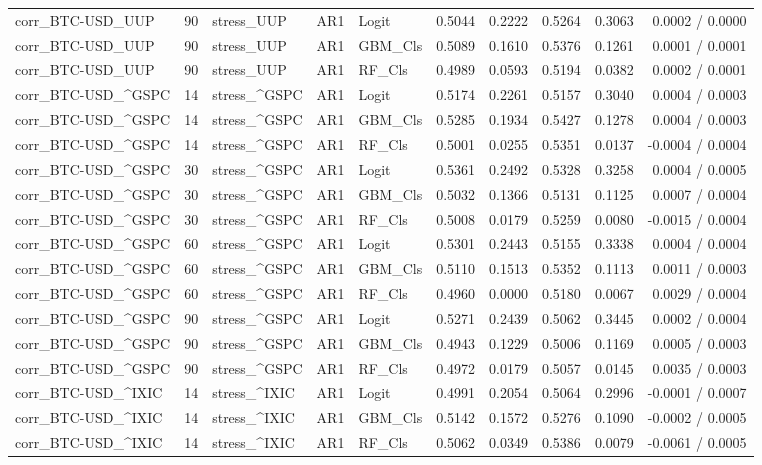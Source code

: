 \begin{table}[H]
\begin{tabular}{lllllrrrrr}
corr_BTC-USD_UUP & 90 & stress_UUP & AR1 & Logit & 0.5044 & 0.2222 & 0.5264 & 0.3063 & 0.0002 / 0.0000 \\
corr_BTC-USD_UUP & 90 & stress_UUP & AR1 & GBM_Cls & 0.5089 & 0.1610 & 0.5376 & 0.1261 & 0.0001 / 0.0001 \\
corr_BTC-USD_UUP & 90 & stress_UUP & AR1 & RF_Cls & 0.4989 & 0.0593 & 0.5194 & 0.0382 & 0.0002 / 0.0001 \\
corr_BTC-USD_^GSPC & 14 & stress_^GSPC & AR1 & Logit & 0.5174 & 0.2261 & 0.5157 & 0.3040 & 0.0004 / 0.0003 \\
corr_BTC-USD_^GSPC & 14 & stress_^GSPC & AR1 & GBM_Cls & 0.5285 & 0.1934 & 0.5427 & 0.1278 & 0.0004 / 0.0003 \\
corr_BTC-USD_^GSPC & 14 & stress_^GSPC & AR1 & RF_Cls & 0.5001 & 0.0255 & 0.5351 & 0.0137 & -0.0004 / 0.0004 \\
corr_BTC-USD_^GSPC & 30 & stress_^GSPC & AR1 & Logit & 0.5361 & 0.2492 & 0.5328 & 0.3258 & 0.0004 / 0.0005 \\
corr_BTC-USD_^GSPC & 30 & stress_^GSPC & AR1 & GBM_Cls & 0.5032 & 0.1366 & 0.5131 & 0.1125 & 0.0007 / 0.0004 \\
corr_BTC-USD_^GSPC & 30 & stress_^GSPC & AR1 & RF_Cls & 0.5008 & 0.0179 & 0.5259 & 0.0080 & -0.0015 / 0.0004 \\
corr_BTC-USD_^GSPC & 60 & stress_^GSPC & AR1 & Logit & 0.5301 & 0.2443 & 0.5155 & 0.3338 & 0.0004 / 0.0004 \\
corr_BTC-USD_^GSPC & 60 & stress_^GSPC & AR1 & GBM_Cls & 0.5110 & 0.1513 & 0.5352 & 0.1113 & 0.0011 / 0.0003 \\
corr_BTC-USD_^GSPC & 60 & stress_^GSPC & AR1 & RF_Cls & 0.4960 & 0.0000 & 0.5180 & 0.0067 & 0.0029 / 0.0004 \\
corr_BTC-USD_^GSPC & 90 & stress_^GSPC & AR1 & Logit & 0.5271 & 0.2439 & 0.5062 & 0.3445 & 0.0002 / 0.0004 \\
corr_BTC-USD_^GSPC & 90 & stress_^GSPC & AR1 & GBM_Cls & 0.4943 & 0.1229 & 0.5006 & 0.1169 & 0.0005 / 0.0003 \\
corr_BTC-USD_^GSPC & 90 & stress_^GSPC & AR1 & RF_Cls & 0.4972 & 0.0179 & 0.5057 & 0.0145 & 0.0035 / 0.0003 \\
corr_BTC-USD_^IXIC & 14 & stress_^IXIC & AR1 & Logit & 0.4991 & 0.2054 & 0.5064 & 0.2996 & -0.0001 / 0.0007 \\
corr_BTC-USD_^IXIC & 14 & stress_^IXIC & AR1 & GBM_Cls & 0.5142 & 0.1572 & 0.5276 & 0.1090 & -0.0002 / 0.0005 \\
corr_BTC-USD_^IXIC & 14 & stress_^IXIC & AR1 & RF_Cls & 0.5062 & 0.0349 & 0.5386 & 0.0079 & -0.0061 / 0.0005 \\

\end{tabular}
\end{table}
